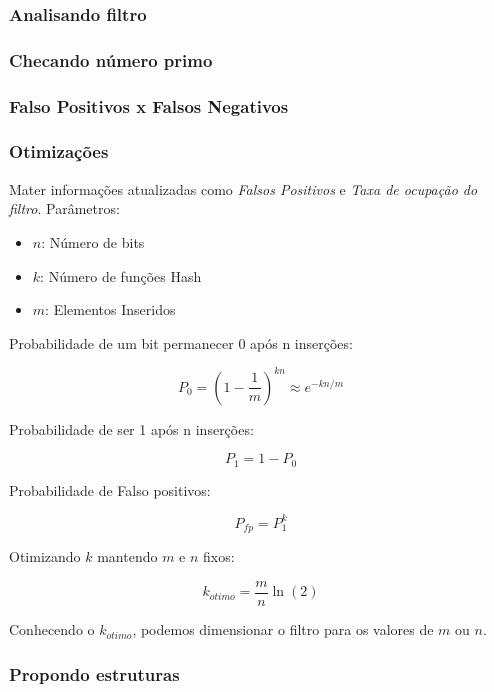 \documentclass[t, handout, xcolor=table, aspectratio=169]{beamer}
\begin{document}
\begin{frame}
  \frametitle{Analisando filtro}

\end{frame}


\begin{frame}
  \frametitle{Checando número primo}

\end{frame}

\begin{frame}
  \frametitle{Falso Positivos x Falsos Negativos}

\end{frame}

\begin{frame}[allowframebreaks]
  \frametitle{Otimizações}
  Mater informações atualizadas como \emph{Falsos Positivos} e \emph{Taxa de ocupação do filtro}.
  Parâmetros:
  \begin{itemize}
    \item \(n\): Número de bits
    \item \(k\): Número de funções Hash
    \item \(m\): Elementos Inseridos
  \end{itemize}

  Probabilidade de um bit permanecer \(0\) após n inserções:

  \[P_0 = \left(1-\frac{1}{m}\right)^{kn} \approx e^{-kn/m}\]

  Probabilidade de ser 1 após n inserções:

  \[P_1 = 1 - P_0\]

  Probabilidade de Falso positivos:

  \[P_{fp} = P_1^k\]

  Otimizando \(k\) mantendo \(m\) e \(n\) fixos:

  $$k_{otimo} = \frac{m}{n} \ln(2)$$

  Conhecendo o $k_{otimo}$, podemos dimensionar o filtro para os valores de \(m\) ou \(n\).
\end{frame}

\begin{frame}
  \frametitle{Propondo estruturas}

\end{frame}
\end{document}
